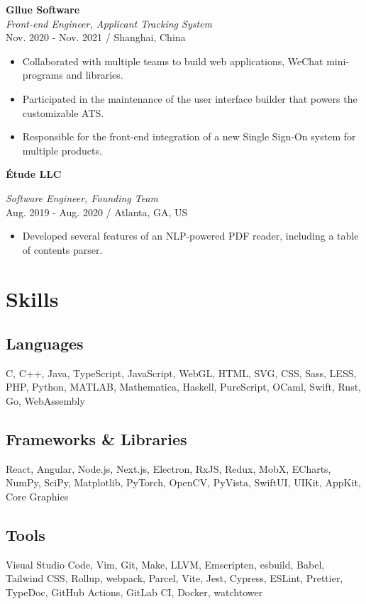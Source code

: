 \documentclass[11pt,twocolumn]{article}
\begin{document}
\textbf{Gllue Software}\\
\textit{Front-end Engineer, Applicant Tracking System}\\
Nov. 2020 - Nov. 2021 / Shanghai, China

\begin{itemize}
\item Collaborated with multiple teams to build web applications, WeChat mini-programs and libraries.
\item Participated in the maintenance of the user interface builder that powers the customizable ATS.
\item Responsible for the front-end integration of a new Single Sign-On system for multiple products.
\end{itemize}

\textbf{Étude LLC}

\textit{Software Engineer, Founding Team}\\
Aug. 2019 - Aug. 2020 / Atlanta, GA, US

\begin{itemize}
\item Developed several features of an NLP-powered PDF reader, including a table of contents parser.
\end{itemize}

\section*{\textsf{Skills}}
\subsection*{Languages}
C, C++, Java, TypeScript, JavaScript, WebGL, HTML, SVG, CSS, Sass, LESS, PHP, Python, MATLAB, Mathematica, Haskell, PureScript, OCaml, Swift, Rust, Go, WebAssembly
\subsection*{Frameworks \& Libraries}
React, Angular, Node.js, Next.js, Electron, RxJS, Redux, MobX, ECharts, NumPy, SciPy, Matplotlib, PyTorch, OpenCV, PyVista, SwiftUI, UIKit, AppKit, Core Graphics
\subsection*{Tools}
Visual Studio Code, Vim, Git, Make, LLVM, Emscripten, esbuild, Babel, Tailwind CSS, Rollup, webpack, Parcel, Vite, Jest, Cypress, ESLint, Prettier, TypeDoc, GitHub Actions, GitLab CI, Docker, watchtower
\end{document}

